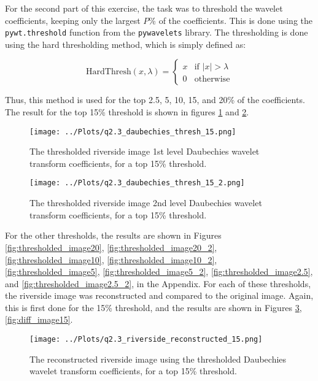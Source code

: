\documentclass[12pt]{report} %
\begin{document}
For the second part of this exercise, the task was to threshold the wavelet coefficients, keeping only the largest $P$\% of the coefficients. This is done using the \texttt{pywt.threshold} function from the \texttt{pywavelets} library. The thresholding is done using the hard thresholding method, which is simply defined as:

\begin{equation}
    \text{HardThresh}(x, \lambda) =
    \begin{cases}
        x & \text{if } |x| > \lambda \\
        0 & \text{otherwise}
    \end{cases}
\end{equation}

Thus, this method is used for the top 2.5, 5, 10, 15, and 20\% of the coefficients. The result for the top 15\% threshold is shown in figures \ref{fig:thresholded_image15} and \ref{fig:thresholded_image15_2}.

\begin{figure}[htbp]
    \centering
    \texttt{[image: ../Plots/q2.3\_daubechies\_thresh\_15.png]}
    \caption{The thresholded riverside image 1st level Daubechies wavelet transform coefficients, for a top 15\% threshold.}
    \label{fig:thresholded_image15}
\end{figure}

\begin{figure}[htbp]
    \centering
    \texttt{[image: ../Plots/q2.3\_daubechies\_thresh\_15\_2.png]}
    \caption{The thresholded riverside image 2nd level Daubechies wavelet transform coefficients, for a top 15\% threshold.}
    \label{fig:thresholded_image15_2}
\end{figure}

For the other thresholds, the results are shown in Figures \ref{fig:thresholded_image20}, \ref{fig:thresholded_image20_2}, \ref{fig:thresholded_image10}, \ref{fig:thresholded_image10_2}, \ref{fig:thresholded_image5}, \ref{fig:thresholded_image5_2}, \ref{fig:thresholded_image2.5}, and \ref{fig:thresholded_image2.5_2}, in the Appendix. For each of these thresholds, the riverside image was reconstructed and compared to the original image. Again, this is first done for the 15\% threshold, and the results are shown in Figures \ref{fig:reconstructed_image15}, \ref{fig:diff_image15}.

\begin{figure}[htbp]
    \centering
    \texttt{[image: ../Plots/q2.3\_riverside\_reconstructed\_15.png]}
    \caption{The reconstructed riverside image using the thresholded Daubechies wavelet transform coefficients, for a top 15\% threshold.}
    \label{fig:reconstructed_image15}
\end{figure}
\end{document}
